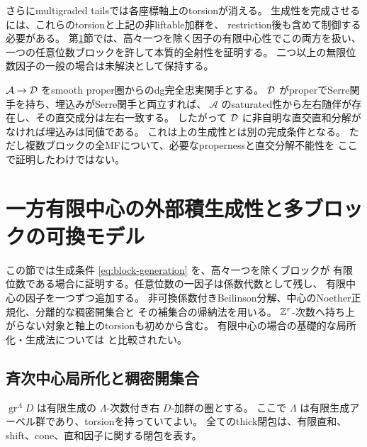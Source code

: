 さらにmultigraded tailsでは各座標軸上のtorsionが消える。
生成性を完成させるには、これらのtorsionと上記の非liftable加群を、
restriction後も含めて制御する必要がある。
第\ref{sec:finite-center}節では、高々一つを除く因子の有限中心性でこの両方を扱い、
一つの任意位数ブロックを許して本質的全射性を証明する。
二つ以上の無限位数因子の一般の場合は未解決として保持する。

\begin{remark}[別の十分条件]
 \(\mathcal A\to\mathcal D\) をsmooth proper圏からのdg完全忠実関手とする。
 \(\mathcal D\) がproperでSerre関手を持ち、埋込みがSerre関手と両立すれば、
 \(\mathcal A\) のsaturated性から左右随伴が存在し、その直交成分は左右一致する。
 したがって \(\mathcal D\) に非自明な直交直和分解がなければ埋込みは同値である。
 これは上の生成性とは別の完成条件となる。
 ただし複数ブロックの全MFについて、必要なpropernessと直交分解不能性を
 ここで証明したわけではない。
\end{remark}

\section{一方有限中心の外部積生成性と多ブロックの可換モデル}\label{sec:finite-center}

この節では生成条件 \eqref{eq:block-generation} を、高々一つを除くブロックが
有限位数である場合に証明する。任意位数の一因子は係数代数として残し、
有限中心の因子を一つずつ追加する。
非可換係数付きBeilinson分解、中心のNoether正規化、分離的な稠密開集合と
その補集合の帰納法を用いる。
\(\mathbb Z^r\)-次数へ持ち上がらない対象と軸上のtorsionも初めから含む。
有限中心の場合の基礎的な局所化・生成法については \cite{ELS} と比較されたい。

\subsection{斉次中心局所化と稠密開集合}

\(\operatorname{gr}^{\Lambda}D\) は有限生成の \(\Lambda\)-次数付き右 \(D\)-加群の圏とする。
ここで \(\Lambda\) は有限生成アーベル群であり、torsionを持っていてよい。
全てのthick閉包は、有限直和、shift、cone、直和因子に関する閉包を表す。

